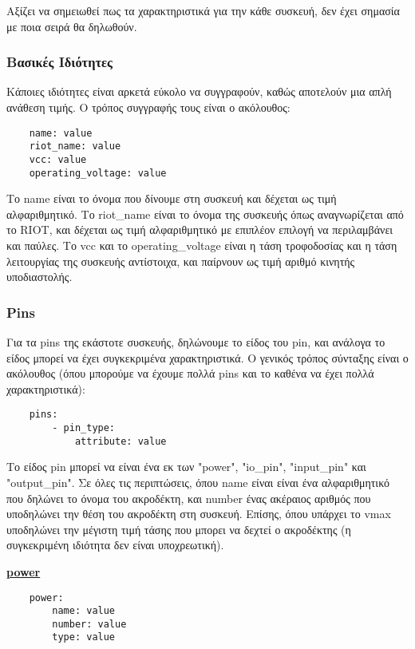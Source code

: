 Αξίζει να σημειωθεί πως τα χαρακτηριστικά για την κάθε συσκευή, δεν έχει σημασία με ποια σειρά θα δηλωθούν.

\subsubsection{Βασικές Ιδιότητες}
Κάποιες ιδιότητες είναι αρκετά εύκολο να συγγραφούν, καθώς αποτελούν μια απλή ανάθεση τιμής. Ο τρόπος συγγραφής τους είναι ο ακόλουθος:

\begin{lstlisting}
	name: value
	riot_name: value
	vcc: value
	operating_voltage: value
\end{lstlisting}

Το name είναι το όνομα που δίνουμε στη συσκευή και δέχεται ως τιμή αλφαριθμητικό. Το riot\_name είναι το όνομα της συσκευής όπως αναγνωρίζεται από το RIOT, και δέχεται ως τιμή αλφαριθμητικό με επιπλέον επιλογή να περιλαμβάνει και παύλες. Το vcc και το operating\_voltage είναι η τάση τροφοδοσίας και η τάση λειτουργίας της συσκευής αντίστοιχα, και παίρνουν ως τιμή αριθμό κινητής υποδιαστολής.

\subsubsection{Pins}

Για τα pins της εκάστοτε συσκευής, δηλώνουμε το είδος του pin, και ανάλογα το είδος μπορεί να έχει συγκεκριμένα χαρακτηριστικά. Ο γενικός τρόπος σύνταξης είναι ο ακόλουθος (όπου μπορούμε να έχουμε πολλά pins και το καθένα να έχει πολλά χαρακτηριστικά):

\begin{lstlisting}
	pins:
		- pin_type:
			attribute: value
\end{lstlisting}

Το είδος pin μπορεί να είναι ένα εκ των "power", "io\_pin", "input\_pin" και "output\_pin". Σε όλες τις περιπτώσεις, όπου name είναι είναι ένα αλφαριθμητικό που δηλώνει το όνομα του ακροδέκτη, και number ένας ακέραιος αριθμός που υποδηλώνει την θέση του ακροδέκτη στη συσκευή. Επίσης, όπου υπάρχει το vmax υποδηλώνει την μέγιστη τιμή τάσης που μπορει να δεχτεί ο ακροδέκτης (η συγκεκριμένη ιδιότητα δεν είναι υποχρεωτική).

\textbf{\underline{power}}

\begin{lstlisting}
	power:
		name: value
		number: value
		type: value
\end{lstlisting}


